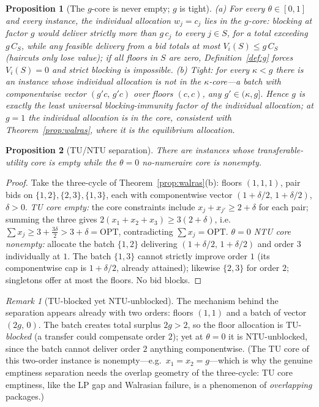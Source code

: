 \documentclass[11pt]{article}
\newtheorem{proposition}{Proposition}
\theoremstyle{remark}
\newtheorem{remark}{Remark}
\newcommand{\OPT}{\mathrm{OPT}}
\begin{document}
\begin{proposition}[The $g$-core is never empty; $g$ is tight]
\label{prop:gcore}
(a) For every $\theta\in[0,1]$ and every instance, the individual
allocation $w_j=c_j$ lies in the $g$-core: blocking at factor $g$ would
deliver strictly more than $g\,c_j$ to every $j\in S$, for a total
exceeding $g\,C_S$, while any feasible delivery from a bid totals at most
$V_i(S)\le g\,C_S$ (haircuts only lose value); if all floors in $S$ are
zero, Definition~\ref{def:g} forces $V_i(S)=0$ and strict blocking is
impossible. (b) Tight: for every
$\kappa<g$ there is an instance whose individual allocation is not in the
$\kappa$-core---a batch with componentwise vector $(g'c,\,g'c)$ over
floors $(c,c)$, any $g'\in(\kappa,g]$. Hence $g$ is exactly the least
universal blocking-immunity factor of the individual allocation; at $g=1$
the individual allocation is in the core, consistent with
Theorem~\ref{prop:walras}, where it is the equilibrium allocation.
\end{proposition}

\begin{proposition}[TU/NTU separation]
\label{prop:ntusep}
There are instances whose transferable-utility core is empty while the
$\theta=0$ no-numeraire core is nonempty.
\end{proposition}

\begin{proof}
Take the three-cycle of Theorem~\ref{prop:walras}(b): floors $(1,1,1)$,
pair bids on $\{1,2\},\{2,3\},\{1,3\}$, each with componentwise vector
$(1+\delta/2,\,1+\delta/2)$, $\delta>0$. \emph{TU core empty:} the core
constraints include $x_j+x_{j'}\ge2+\delta$ for each pair; summing the
three gives $2(x_1+x_2+x_3)\ge3(2+\delta)$, i.e.\
$\sum x_j\ge3+\tfrac{3\delta}2>3+\delta=\OPT$, contradicting
$\sum x_j=\OPT$. \emph{$\theta=0$ NTU core nonempty:} allocate the batch
$\{1,2\}$ delivering $(1+\delta/2,\,1+\delta/2)$ and order $3$
individually at $1$. The batch $\{1,3\}$ cannot strictly improve order
$1$ (its componentwise cap is $1+\delta/2$, already attained); likewise
$\{2,3\}$ for order $2$; singletons offer at most the floors. No bid
blocks.
\end{proof}

\begin{remark}[TU-blocked yet NTU-unblocked]\label{rem:tublocked}
The mechanism behind the separation appears already with two orders:
floors $(1,1)$ and a batch of vector $(2g,\,0)$. The batch creates total
surplus $2g>2$, so the floor allocation is TU-\emph{blocked} (a transfer
could compensate order $2$); yet at $\theta=0$ it is NTU-unblocked, since
the batch cannot deliver order $2$ anything componentwise. (The TU core
of this two-order instance is nonempty---e.g.\ $x_1=x_2=g$---which is why
the genuine emptiness separation needs the overlap geometry of the
three-cycle: TU core emptiness, like the LP gap and Walrasian failure, is
a phenomenon of \emph{overlapping} packages.)
\end{remark}
\end{document}
